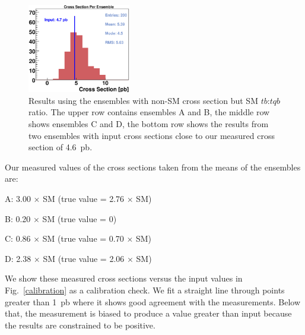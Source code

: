 \begin{figure}[!h!tbp]
\includegraphics[width=0.40\textwidth]{figures/ensembles/Ensembles4.7.eps}
\vspace{-0.1in}
\caption{Results using the ensembles with non-SM cross section but
SM $tb$:$tqb$ ratio. The upper row contains ensembles A and B, the
middle row shows ensembles C and D, the bottom row shows the results
from two ensembles with input cross sections close to our measured
cross section of 4.6~pb.}
\label{ensembles}
\end{figure}

Our measured values of the cross sections taken from the means of the
ensembles are:
\vspace{-0.05in}
\begin{myitemize}
\item A: 3.00 $\times$ SM \hspace{0.2in}(true value = 2.76 $\times$ SM)
\item B: 0.20 $\times$ SM \hspace{0.2in}(true value = 0)
\item C: 0.86 $\times$ SM \hspace{0.2in}(true value = 0.70 $\times$ SM)
\item D: 2.38 $\times$ SM \hspace{0.2in}(true value = 2.06 $\times$ SM)
\end{myitemize} 

We show these measured cross sections versus the input values in
Fig.~\ref{calibration} as a calibration check. We fit a straight line
through points greater than 1~pb where it shows good agreement with
the measurements. Below that, the measurement is biased to produce a
value greater than input because the results are constrained to be
positive.

\clearpage

